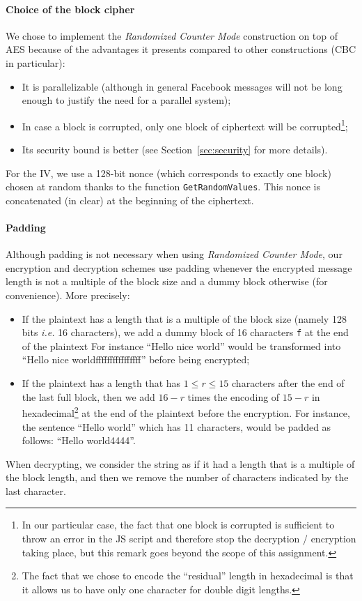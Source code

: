 \documentclass[10pt,twocolumn]{article}
\begin{document}
\paragraph{Choice of the block cipher}
We chose to implement the \emph{Randomized Counter Mode} construction on top of AES because of the advantages it presents compared to other constructions (CBC in particular):
\begin{itemize}
  \item It is parallelizable (although in general Facebook messages will not be long enough to justify the need for a parallel system);
  \item In case a block is corrupted, only one block of ciphertext will be corrupted\footnote{In our particular case, the fact that one block is corrupted is sufficient to throw an error in the JS script and therefore stop the decryption / encryption taking place, but this remark goes beyond the scope of this assignment.};
  \item Its security bound is better (see Section~\ref{sec:security} for more details).
\end{itemize}
For the IV, we use a 128-bit nonce (which corresponds to exactly one block) chosen at random thanks to the function \texttt{GetRandomValues}. This nonce is concatenated (in clear) at the beginning of the ciphertext.

\paragraph{Padding}
Although padding is not necessary when using \emph{Randomized Counter Mode}, our encryption and decryption schemes use padding whenever the encrypted message length is not a multiple of the block size and a dummy block otherwise (for convenience). More precisely:
\begin{itemize}
  \item If the plaintext has a length that is a multiple of the block size (namely 128 bits \emph{i.e.} 16 characters), we add a dummy block of 16 characters \texttt{f} at the end of the plaintext
For instance ``Hello nice world'' would be transformed into ``Hello nice worldffffffffffffffff'' before being encrypted;
  \item If the plaintext has a length that has $1 \leq r \leq 15$ characters after the end of the last full block, then we add $16-r$ times the encoding of $15-r$ in hexadecimal\footnote{The fact that we chose to encode the “residual” length in hexadecimal is that it allows us to have only one character for double digit lengths.} at the end of the plaintext before the encryption.
For instance, the sentence ``Hello world'' which has 11 characters, would be padded as follows: ``Hello world4444''.
\end{itemize}
When decrypting, we consider the string as if it had a length that is a multiple of the block length, and then we remove the number of characters indicated by the last character.
\end{document}
